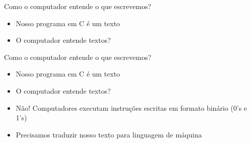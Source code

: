 \documentclass[t, aspectratio=169]{beamer}
\begin{document}
\begin{frame}[label={sec:orgc63d011}]{Como o computador entende o que escrevemos?}
\begin{itemize}
\item Nosso programa em C é um texto
\item O computador entende textos?
\end{itemize}
\end{frame}

\begin{frame}[label={sec:org0b4d8a9}]{Como o computador entende o que escrevemos?}
\begin{itemize}
\item Nosso programa em C é um texto
\item O computador entende textos?
\item \alert{Não!} Computadores executam instruções escritas em formato binário (0's e 1's)
\item Precisamos traduzir nosso texto para \alert{linguagem de máquina}
\end{itemize}
\end{frame}
\end{document}
